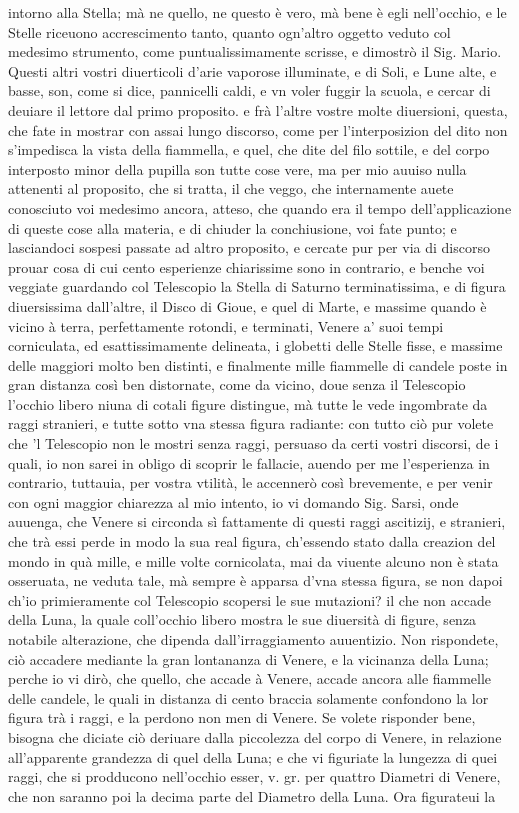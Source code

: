 \documentclass[11pt,twoside,openany]{book}
\begin{document}
intorno alla Stella; mà ne quello, ne questo è vero, mà bene è egli nell'occhio, e le Stelle riceuono accrescimento tanto, quanto ogn'altro oggetto veduto col medesimo strumento, come puntualissimamente scrisse, e dimostrò il Sig. Mario. Questi altri vostri diuerticoli d'arie vaporose illuminate, e di Soli, e Lune alte, e basse, son, come si dice, pannicelli caldi, e vn voler fuggir la scuola, e cercar di deuiare il lettore dal primo proposito. e frà l'altre vostre molte diuersioni, questa, che fate in mostrar con assai lungo discorso, come per l'interposizion del dito non s'impedisca la vista della fiammella, e quel, che dite del filo sottile, e del corpo interposto minor della pupilla son tutte cose vere, ma per mio auuiso nulla attenenti al proposito, che si tratta, il che veggo, che internamente auete conosciuto voi medesimo ancora, atteso, che quando era il tempo dell'applicazione di queste cose alla materia, e di chiuder la conchiusione, voi fate punto; e lasciandoci sospesi passate ad altro proposito, e cercate pur per via di discorso prouar cosa di cui cento esperienze chiarissime sono in contrario, e benche voi veggiate guardando col Telescopio la Stella di Saturno terminatissima, e di figura diuersissima dall'altre, il Disco di Gioue, e quel di Marte, e massime quando è vicino à terra, perfettamente rotondi, e terminati, Venere a' suoi tempi corniculata, ed esattissimamente delineata, i globetti delle Stelle fisse, e massime delle maggiori molto ben distinti, e finalmente mille fiammelle di candele poste in gran distanza così ben distornate, come da vicino, doue senza il Telescopio l'occhio libero niuna di cotali figure distingue, mà tutte le vede ingombrate da raggi stranieri, e tutte sotto vna stessa figura radiante: con tutto ciò pur volete che 'l Telescopio non le mostri senza raggi, persuaso da certi vostri discorsi, de i quali, io non sarei in obligo di scoprir le fallacie, auendo per me l'esperienza in contrario, tuttauia, per vostra vtilità, le accennerò così brevemente, e per venir con ogni maggior chiarezza al mio intento, io vi domando Sig. Sarsi, onde auuenga, che Venere si circonda sì fattamente di questi raggi ascitizij, e stranieri, che trà essi perde in modo la sua real figura, ch'essendo stato dalla creazion del mondo in quà mille, e mille volte cornicolata, mai da viuente alcuno non è stata osseruata, ne veduta tale, mà sempre è apparsa d'vna stessa figura, se non dapoi ch'io primieramente col Telescopio scopersi le sue mutazioni? il che non accade della Luna, la quale coll'occhio libero mostra le sue diuersità di figure, senza notabile alterazione, che dipenda dall'irraggiamento auuentizio. Non rispondete, ciò accadere mediante la gran lontananza di Venere, e la vicinanza della Luna; perche io vi dirò, che quello, che accade à Venere, accade ancora alle fiammelle delle candele, le quali in distanza di cento braccia solamente confondono la lor figura trà i raggi, e la perdono non men di Venere. Se volete risponder bene, bisogna che diciate ciò deriuare dalla piccolezza del corpo di Venere, in relazione all'apparente grandezza di quel della Luna; e che vi figuriate la lungezza di quei raggi, che si prodducono nell'occhio esser, v. gr. per quattro Diametri di Venere, che non saranno poi la decima parte del Diametro della Luna. Ora figurateui la 
\end{document}
